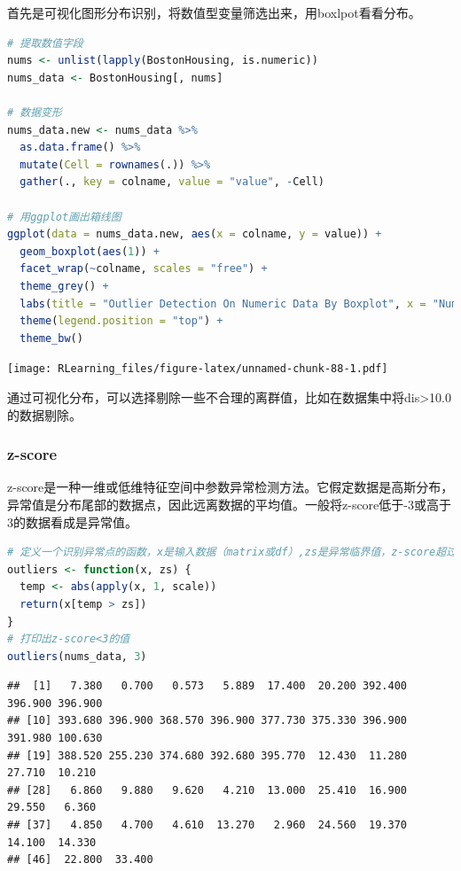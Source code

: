 \documentclass[]{ctexbook}
\begin{document}
首先是可视化图形分布识别，将数值型变量筛选出来，用boxlpot看看分布。

\begin{lstlisting}[language=R]
# 提取数值字段
nums <- unlist(lapply(BostonHousing, is.numeric))
nums_data <- BostonHousing[, nums]

# 数据变形
nums_data.new <- nums_data %>%
  as.data.frame() %>%
  mutate(Cell = rownames(.)) %>%
  gather(., key = colname, value = "value", -Cell)

# 用ggplot画出箱线图
ggplot(data = nums_data.new, aes(x = colname, y = value)) +
  geom_boxplot(aes(1)) +
  facet_wrap(~colname, scales = "free") +
  theme_grey() +
  labs(title = "Outlier Detection On Numeric Data By Boxplot", x = "Numeric Columns", y = "") +
  theme(legend.position = "top") +
  theme_bw()
\end{lstlisting}

\texttt{[image: RLearning\_files/figure-latex/unnamed-chunk-88-1.pdf]}

通过可视化分布，可以选择剔除一些不合理的离群值，比如在数据集中将dis\textgreater10.0的数据剔除。

\hypertarget{z-score}{%
\subsubsection{z-score}\label{z-score}}

z-score是一种一维或低维特征空间中参数异常检测方法。它假定数据是高斯分布，异常值是分布尾部的数据点，因此远离数据的平均值。一般将z-score低于-3或高于3的数据看成是异常值。

\begin{lstlisting}[language=R]
# 定义一个识别异常点的函数，x是输入数据（matrix或df）,zs是异常临界值，z-score超过zs的被识别为异常点
outliers <- function(x, zs) {
  temp <- abs(apply(x, 1, scale))
  return(x[temp > zs])
}
# 打印出z-score<3的值
outliers(nums_data, 3)
\end{lstlisting}

\begin{lstlisting}
##  [1]   7.380   0.700   0.573   5.889  17.400  20.200 392.400 396.900 396.900
## [10] 393.680 396.900 368.570 396.900 377.730 375.330 396.900 391.980 100.630
## [19] 388.520 255.230 374.680 392.680 395.770  12.430  11.280  27.710  10.210
## [28]   6.860   9.880   9.620   4.210  13.000  25.410  16.900  29.550   6.360
## [37]   4.850   4.700   4.610  13.270   2.960  24.560  19.370  14.100  14.330
## [46]  22.800  33.400
\end{lstlisting}
\end{document}
